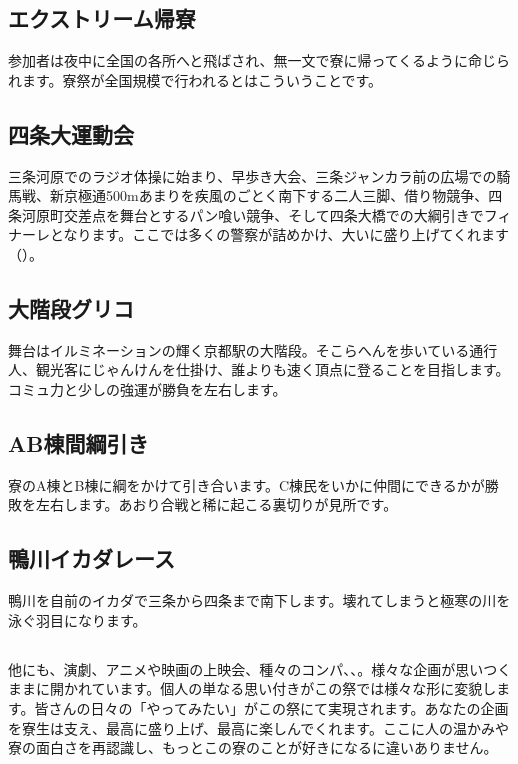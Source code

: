 \subsection{エクストリーム帰寮}

参加者は夜中に全国の各所へと飛ばされ、無一文で寮に帰ってくるように命じられます。寮祭が全国規模で行われるとはこういうことです。



\subsection{四条大運動会}

三条河原でのラジオ体操に始まり、早歩き大会、三条ジャンカラ前の広場での騎馬戦、新京極通500mあまりを疾風のごとく南下する二人三脚、借り物競争、四条河原町交差点を舞台とするパン喰い競争、そして四条大橋での大綱引きでフィナーレとなります。ここでは多くの警察が詰めかけ、大いに盛り上げてくれます（）。



\subsection{大階段グリコ}

舞台はイルミネーションの輝く京都駅の大階段。そこらへんを歩いている通行人、観光客にじゃんけんを仕掛け、誰よりも速く頂点に登ることを目指します。コミュ力と少しの強運が勝負を左右します。

\subsection{AB棟間綱引き}

寮のA棟とB棟に綱をかけて引き合います。C棟民をいかに仲間にできるかが勝敗を左右します。あおり合戦と稀に起こる裏切りが見所です。

\subsection{鴨川イカダレース}

鴨川を自前のイカダで三条から四条まで南下します。壊れてしまうと極寒の川を泳ぐ羽目になります。


\subsection{}

他にも、演劇、アニメや映画の上映会、種々のコンパ、、。様々な企画が思いつくままに開かれています。個人の単なる思い付きがこの祭では様々な形に変貌します。皆さんの日々の「やってみたい」がこの祭にて実現されます。あなたの企画を寮生は支え、最高に盛り上げ、最高に楽しんでくれます。ここに人の温かみや寮の面白さを再認識し、もっとこの寮のことが好きになるに違いありません。

